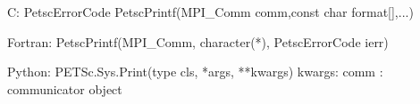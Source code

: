 C:
PetscErrorCode  PetscPrintf(MPI_Comm comm,const char format[],...)

Fortran:
PetscPrintf(MPI_Comm, character(*), PetscErrorCode ierr)

Python:
PETSc.Sys.Print(type cls, *args, **kwargs)
kwargs:
comm : communicator object
